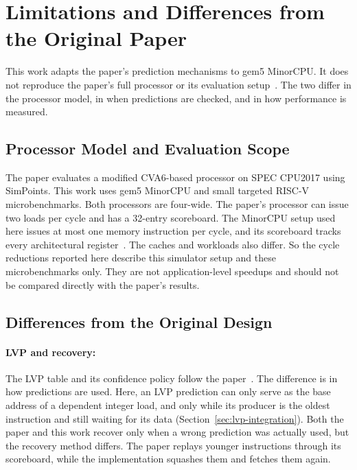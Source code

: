 \section{Limitations and Differences from the Original Paper}

This work adapts the paper's prediction mechanisms to gem5 MinorCPU.
It does not reproduce the paper's full processor or its evaluation
setup~\cite{ravenel2025architecting}. The two differ in the
processor model, in when predictions are checked, and in how
performance is measured.

\subsection{Processor Model and Evaluation Scope}

The paper evaluates a modified CVA6-based processor on SPEC CPU2017
using SimPoints. This work uses gem5 MinorCPU and small targeted
RISC-V microbenchmarks. Both processors are four-wide. The paper's
processor can issue two loads per cycle and has a 32-entry
scoreboard. The MinorCPU setup used here issues at most one memory
instruction per cycle, and its scoreboard tracks every architectural
register~\cite{ravenel2025architecting}. The caches and workloads
also differ. So the cycle reductions reported here describe this
simulator setup and these microbenchmarks only. They are not
application-level speedups and should not be compared directly with
the paper's results.

\subsection{Differences from the Original Design}
\label{subsec:original-design-differences}

\paragraph{LVP and recovery:} The LVP table and its confidence policy
follow the paper~\cite{ravenel2025architecting}. The difference is in
how predictions are used. Here, an LVP prediction can only serve as
the base address of a dependent integer load, and only while its
producer is the oldest instruction and still waiting for its data
(Section~\ref{sec:lvp-integration}). Both the paper and this work
recover only when a wrong prediction was actually used, but the
recovery method differs. The paper replays younger instructions
through its scoreboard, while the implementation squashes them and fetches
them again.


